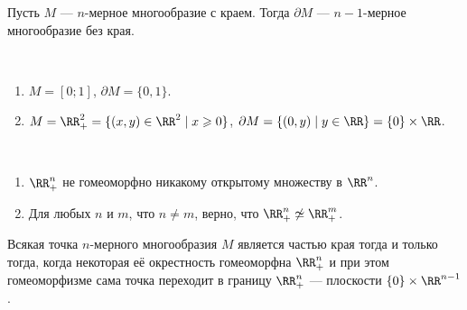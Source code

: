 \documentclass[12pt,a4paper]{article}
\begin{document}
    \begin{theorem}
        Пусть $M$ --- $n$-мерное многообразие с краем. Тогда $\partial M$ --- $n-1$-мерное многообразие без края.
    \end{theorem}

    \begin{example}\ 
        \begin{enumerate}
            \item $M = [0; 1]$, $\partial M = \{0, 1\}$.
            \item $M = \RR^2_+ = \{(x, y) \in \RR^2 \mid x \geqslant 0\}$, $\partial M = \{(0, y) \mid y \in \RR\} = \{0\} \times \RR$.
        \end{enumerate}
    \end{example}

    \begin{theorem}\ 
        \begin{enumerate}
            \item $\RR^n_+$ не гомеоморфно никакому открытому множеству в $\RR^n$.
            \item Для любых $n$ и $m$, что $n \neq m$, верно, что $\RR^n_+ \not\simeq \RR^m_+$.
        \end{enumerate}
    \end{theorem}

    \begin{corollary}
        Всякая точка $n$-мерного многообразия $M$ является частью края тогда и только тогда, когда некоторая её окрестность гомеоморфна $\RR^n_+$ и при этом гомеоморфизме сама точка переходит в границу $\RR^n_+$ --- плоскости $\{0\} \times \RR^{n-1}$.
    \end{corollary}
\end{document}
